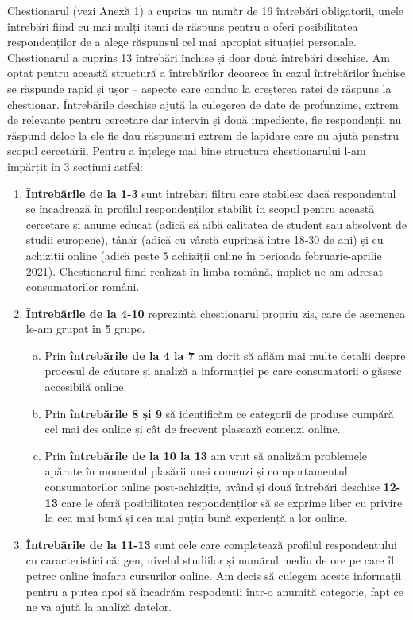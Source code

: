 \documentclass[a4paper, 12pt]{article}
\begin{document}
		\quad Chestionarul (vezi Anexă 1) a cuprins un număr de 16 întrebări obligatorii, unele întrebări fiind cu mai mulți itemi de răspuns pentru a oferi posibilitatea respondenților de a alege răspunsul cel mai apropiat situației personale. Chestionarul a cuprins 13 întrebări închise și doar două întrebări deschise. Am optat pentru această structură a întrebărilor deoarece în cazul întrebărilor închise se răspunde rapid și ușor – aspecte care conduc la creșterea ratei de răspuns la chestionar. Întrebările deschise  ajută la culegerea de date de profunzime, extrem de relevante pentru cercetare dar intervin și două impediente, fie respondenții nu răspund deloc la ele fie dau răspunsuri extrem de lapidare care nu ajută penstru scopul cercetării. Pentru a înțelege mai bine structura chestionarului l-am împărțit în 3 secțiuni astfel:
		\begin{enumerate}[(1)]
			\item\textbf{Întrebările de la 1-3}  sunt întrebări filtru care stabilesc dacă respondentul se încadrează în profilul respondenților stabilit în scopul pentru această cercetare și anume educat (adică să aibă calitatea de student sau absolvent de studii europene), tânăr (adică cu vârstă cuprinsă între 18-30 de ani) și cu achiziții online (adică peste 5 achiziții online în perioada februarie-aprilie 2021). Chestionarul fiind realizat în limba română, implict ne-am adresat consumatorilor români. 
			\item\textbf{Întrebările de la 4-10} reprezintă chestionarul propriu zis, care de asemenea le-am grupat în 5 grupe.
		\begin{enumerate}[(a)]
			\item Prin \textbf{întrebările de la 4 la 7} am dorit să aflăm mai multe detalii despre procesul de căutare și analiză a informației pe care consumatorii o găsesc accesibilă online.
			\item Prin \textbf{întrebările 8 și 9} să identificăm ce categorii de produse cumpără cel mai des online și cât de frecvent plasează comenzi online.
			\item Prin \textbf{întrebările de la 10 la 13} am vrut să analizăm problemele apărute în momentul plasării unei comenzi și comportamentul consumatorilor online post-achiziție, având și două întrebări deschise \textbf {12-13} care le oferă posibilitatea respondenților să se exprime liber cu privire la cea mai bună și cea mai puțin bună experiență a lor online.
		\end{enumerate}
		\item\textbf{Întrebările de la 11-13} sunt cele care completează profilul respondentului cu caracteristici că: gen, nivelul studiilor și numărul mediu de ore pe care îl petrec online înafara cursurilor online. Am decis să culegem aceste informații pentru a putea apoi să încadrăm respodentii într-o anumită categorie, fapt ce ne va ajută la analiză datelor.
	\end{enumerate}
\end{document}
